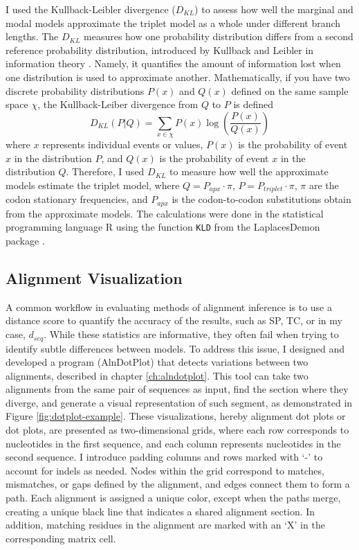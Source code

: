 I used the Kullback-Leibler divergence ($D_{KL}$) to assess how well the marginal and modal models approximate the triplet model as a whole under different branch lengths. The $D_{KL}$ measures how one probability distribution differs from a second reference probability distribution, introduced by Kullback and Leibler in information theory \citeyearpar{kullback1951KLD}. Namely, it quantifies the amount of information lost when one distribution is used to approximate another. Mathematically, if you have two discrete probability distributions $P(x)$ and $Q(x)$ defined on the same sample space $\chi$, the Kullback-Leiber divergence from $Q$ to $P$ is defined
%
\begin{equation} \label{eq:KLD}
    D_{KL} (P | Q) = \sum_{x \in \chi} P(x) \log \left( \frac{P(x)}{Q(x)} \right)
\end{equation}
%
where $x$ represents individual events or values, $P(x)$ is the probability of event $x$ in the distribution $P$, and $Q(x)$ is the probability of event $x$ in the distribution $Q$. Therefore, I used $D_{KL}$ to measure how well the approximate models estimate the triplet model, where $Q = P_{apx} \cdot \pi$, $P = P_{triplet} \cdot \pi$, $\pi$ are the codon stationary frequencies, and $P_{apx}$ is the codon-to-codon substitutions obtain from the approximate models. The calculations were done in the statistical programming language R using the function \verb|KLD| from the LaplacesDemon package \citep{statisticat2021laplacesdemon}.


\subsection{Alignment Visualization} %

A common workflow in evaluating methods of alignment inference is to use a distance score to quantify the accuracy of the results, such as SP, TC, or in my case, $d_{seq}$. While these statistics are informative, they often fail when trying to identify subtle differences between models. To address this issue, I designed and developed a program (AlnDotPlot) that detects variations between two alignments, described in chapter \ref{ch:alndotplot}. This tool can take two alignments from the same pair of sequences as input, find the section where they diverge, and generate a visual representation of such segment, as demonstrated in Figure \ref{fig:dotplot-example}. These visualizations, hereby alignment dot plots or dot plots, are presented as two-dimensional grids, where each row corresponds to nucleotides in the first sequence, and each column represents nucleotides in the second sequence. I introduce padding columns and rows marked with `-' to account for indels as needed. Nodes within the grid correspond to matches, mismatches, or gaps defined by the alignment, and edges connect them to form a path. Each alignment is assigned a unique color, except when the paths merge, creating a unique black line that indicates a shared alignment section. In addition, matching residues in the alignment are marked with an `X' in the corresponding matrix cell.


